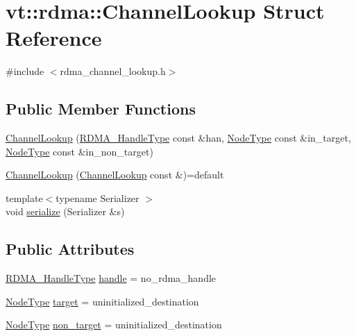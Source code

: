 \hypertarget{structvt_1_1rdma_1_1_channel_lookup}{}\section{vt\+:\+:rdma\+:\+:Channel\+Lookup Struct Reference}
\label{structvt_1_1rdma_1_1_channel_lookup}


{\ttfamily \#include $<$rdma\+\_\+channel\+\_\+lookup.\+h$>$}

\subsection*{Public Member Functions}
\begin{DoxyCompactItemize}
\item 
\hyperlink{structvt_1_1rdma_1_1_channel_lookup_a6e438b399a526542f97ef6cbf96a7378}{Channel\+Lookup} (\hyperlink{namespacevt_a10442579ec4e7ebef223818e64bcf908}{R\+D\+M\+A\+\_\+\+Handle\+Type} const \&han, \hyperlink{namespacevt_a866da9d0efc19c0a1ce79e9e492f47e2}{Node\+Type} const \&in\+\_\+target, \hyperlink{namespacevt_a866da9d0efc19c0a1ce79e9e492f47e2}{Node\+Type} const \&in\+\_\+non\+\_\+target)
\item 
\hyperlink{structvt_1_1rdma_1_1_channel_lookup_af5ffd2e82bd5972d35f03be34279e4d6}{Channel\+Lookup} (\hyperlink{structvt_1_1rdma_1_1_channel_lookup}{Channel\+Lookup} const \&)=default
\item 
{\footnotesize template$<$typename Serializer $>$ }\\void \hyperlink{structvt_1_1rdma_1_1_channel_lookup_a977e409cf3f8da76e2492f4ab17bee84}{serialize} (Serializer \&s)
\end{DoxyCompactItemize}
\subsection*{Public Attributes}
\begin{DoxyCompactItemize}
\item 
\hyperlink{namespacevt_a10442579ec4e7ebef223818e64bcf908}{R\+D\+M\+A\+\_\+\+Handle\+Type} \hyperlink{structvt_1_1rdma_1_1_channel_lookup_a02cd23701c295b73675c998d4e84c4b9}{handle} = no\+\_\+rdma\+\_\+handle
\item 
\hyperlink{namespacevt_a866da9d0efc19c0a1ce79e9e492f47e2}{Node\+Type} \hyperlink{structvt_1_1rdma_1_1_channel_lookup_a5fc6e66edbe73653e261246202d22b97}{target} = uninitialized\+\_\+destination
\item 
\hyperlink{namespacevt_a866da9d0efc19c0a1ce79e9e492f47e2}{Node\+Type} \hyperlink{structvt_1_1rdma_1_1_channel_lookup_ae01c924a3a559f70dfda62b187989f51}{non\+\_\+target} = uninitialized\+\_\+destination
\end{DoxyCompactItemize}


